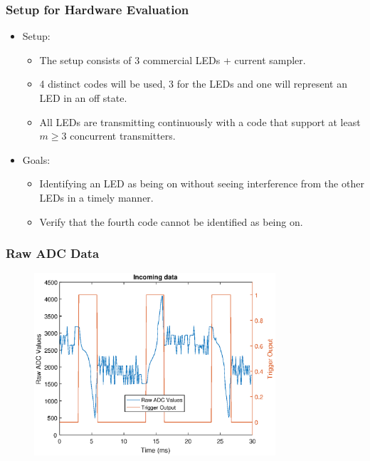 \documentclass{beamer}
\begin{document}
	\begin{frame}\frametitle{Setup for Hardware Evaluation}
		
		

		\begin{itemize}

			\item Setup: 
			\begin{itemize}
				\item The setup consists of 3 commercial LEDs + current sampler.

				\item 4 distinct codes will be used, 3 for the LEDs and one will represent an LED in an off state.

				\item All LEDs are transmitting continuously with a code that support at least $m \ge 3$ concurrent transmitters.
			\end{itemize}

			\item Goals:
			\begin{itemize}
				\item Identifying an LED as being on without seeing interference from the other LEDs in a timely manner.

				\item Verify that the fourth code cannot be identified as being on. 

			\end{itemize}



		\end{itemize}
	\end{frame}




	\begin{frame}\frametitle{Raw ADC Data}

		\begin{figure}
			\centering
			\includegraphics[width=0.8\textwidth]{ac-raw-data.eps}
		\end{figure}

	\end{frame}
\end{document}
